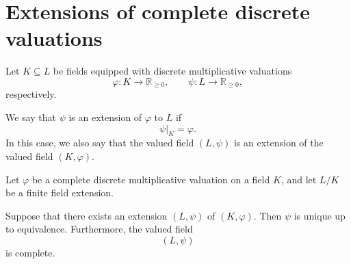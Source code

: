 \section{Extensions of complete discrete valuations}

\begin{definition}
    Let \(K\subseteq L\) be fields equipped with discrete multiplicative valuations
    \[
        \varphi:K\longrightarrow \mathbb{R}_{\geq 0},
        \qquad
        \psi:L\longrightarrow \mathbb{R}_{\geq 0},
    \]
    respectively.

    We say that \(\psi\) is an extension of \(\varphi\) to \(L\) if
    \[
        \psi|_{K}=\varphi.
    \]
    In this case, we also say that the valued field \((L,\psi)\) is an extension of
    the valued field \((K,\varphi)\).
\end{definition}

\begin{theorem}
    Let \(\varphi\) be a complete discrete multiplicative valuation on a field \(K\),
    and let \(L/K\) be a finite field extension.

    Suppose that there exists an extension \((L,\psi)\) of \((K,\varphi)\). Then
    \(\psi\) is unique up to equivalence. Furthermore, the valued field
    \[
        (L,\psi)
    \]
    is complete.
\end{theorem}

